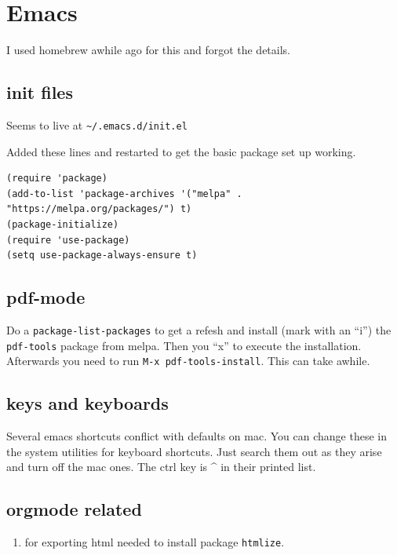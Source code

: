 \documentclass[
  letterpaper,
  DIV=11,
  numbers=noendperiod]{scrreprt}
\providecommand{\tightlist}{%
  \setlength{\itemsep}{0pt}\setlength{\parskip}{0pt}}\usepackage{longtable,booktabs,array}
\begin{document}
\chapter{Emacs}\label{emacs}

I used homebrew awhile ago for this and forgot the details.

\section{init files}\label{init-files}

Seems to live at \texttt{\textasciitilde{}/.emacs.d/init.el}

Added these lines and restarted to get the basic package set up working.

\begin{verbatim}
(require 'package)
(add-to-list 'package-archives '("melpa" . "https://melpa.org/packages/") t)
(package-initialize)
(require 'use-package)
(setq use-package-always-ensure t)
\end{verbatim}

\section{pdf-mode}\label{pdf-mode}

Do a \texttt{package-list-packages} to get a refesh and install (mark
with an ``i'') the \texttt{pdf-tools} package from melpa. Then you ``x''
to execute the installation. Afterwards you need to run
\texttt{M-x\ pdf-tools-install}. This can take awhile.

\section{keys and keyboards}\label{keys-and-keyboards}

Several emacs shortcuts conflict with defaults on mac. You can change
these in the system utilities for keyboard shortcuts. Just search them
out as they arise and turn off the mac ones. The ctrl key is \^{} in
their printed list.

\section{orgmode related}\label{orgmode-related}

\begin{enumerate}
\def\labelenumi{\arabic{enumi}.}
\tightlist
\item
  for exporting html needed to install package \texttt{htmlize}.
\end{enumerate}
\end{document}
